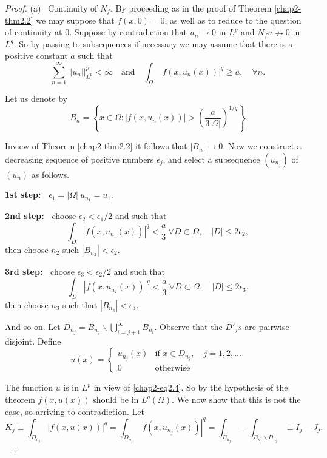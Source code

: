 \begin{proof}
(a)~ Continuity of $N_{f}$. By proceeding as in the proof of Theorem
  \ref{chap2-thm2.2} we may suppose that $f(x,0)=0$, as well as to
  reduce to the question of continuity at $0$. Suppose by
  contradiction that $u_{n}\to 0$ in $L^{p}$ and $N_{f}u\nrightarrow 0$ in
  $L^{q}$. So by passing to subsequences if necessary we may assume
  that there is a positive constant $a$ such that 
\begin{equation*}
\sum\limits^{\infty}_{n=1}||u_{n}||^{p}_{L^{p}}<\infty\quad\text{and}\quad
\int_{\Omega}|f(x,u_{n}(x))|^{q}\geq a,\quad \forall
n.\tag{2.4}\label{chap2-eq2.4} 
\end{equation*}

Let us denote by
$$
B_{n}=\left\{x\in\Omega:|f(x,u_{n}(x))|>\left(\frac{a}{3|\Omega|}\right)^{1/q}\right\}
$$

In\pageoriginale view of Theorem \ref{chap2-thm2.2} it follows that
$|B_{n}|\to 0$. Now we construct a decreasing sequence of positive
numbers $\epsilon_{j}$, and select a subsequence $(u_{n_{j}})$ of
$(u_{n})$ as follows.

\medskip
\noindent
{\bf 1st step:~} $\epsilon_{1}=|\Omega|~u_{n_{1}}=u_{1}$.
\smallskip

\noindent
{\bf 2nd step:~} choose $\epsilon_{2}<\epsilon_{1}/2$ and such that
$$
\int_{D}|f(x,u_{n_{1}}(x))|^{q}<\frac{a}{3}\ \forall
D\subset\Omega,\quad |D|\leq 2\epsilon_{2},
$$
then choose $n_{2}$ such $|B_{n_{2}}|<\epsilon_{2}$. 
\smallskip

\noindent
{\bf 3rd step:~} choose $\epsilon_{3}<\epsilon_{2}/2$ and such that
$$
\int_{D}|f(x,u_{n_{2}}(x))|^{q}<\frac{a}{3}~\forall D\subset
\Omega,\quad |D|\leq 2\epsilon_{3}.
$$ 
then choose $n_{3}$ such that $|B_{n_{3}}|<\epsilon_{3}$.
\smallskip

And so on. Let $D_{n_{j}}=B_{n_{j}}\backslash
\bigcup\limits^{\infty}_{i=j+1}B_{n_{i}}$. Observe that the $D'_{j}s$ are
pairwise disjoint. Define
$$
u(x)=
\begin{cases}
u_{n_{j}}(x) & \text{if~} x\in D_{n_{j}},\quad j=1,2,\ldots\\
0 & \text{otherwise}
\end{cases}
$$

The function $u$ is in $L^{p}$ in view of \eqref{chap2-eq2.4}. So by
the hypothesis of the theorem $f(x,u(x))$ should be in
$L^{q}(\Omega)$. We now show that this is not the case, so arriving to
contradiction. Let
$$
K_{j}\equiv
\int_{D_{n_{j}}}|f(x,u(x))|^{q}=\int_{D_{n_{j}}}|f(x,u_{n_{j}}(x))|^{q}=\int_{B_{n_{j}}}-\int_{B_{n_{j}}\backslash
  D_{n_{j}}}\equiv I_{j}-J_{j}. 
$$


\end{proof}
